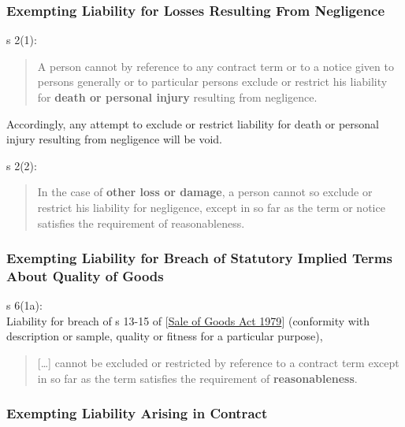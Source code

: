 \documentclass[
]{article}
\begin{document}
\hypertarget{exempting-liability-for-losses-resulting-from-negligence}{%
\subsubsection{Exempting Liability for Losses Resulting From
Negligence}\label{exempting-liability-for-losses-resulting-from-negligence}}

s 2(1):

\begin{quote}
A person cannot by reference to any contract term or to a notice given
to persons generally or to particular persons exclude or restrict his
liability for \textbf{death or personal injury} resulting from
negligence.
\end{quote}

Accordingly, any attempt to exclude or restrict liability for death or
personal injury resulting from negligence will be void.

s 2(2):

\begin{quote}
In the case of \textbf{other loss or damage}, a person cannot so exclude
or restrict his liability for negligence, except in so far as the term
or notice satisfies the requirement of reasonableness.
\end{quote}

\hypertarget{exempting-liability-for-breach-of-statutory-implied-terms-about-quality-of-goods}{%
\subsubsection{Exempting Liability for Breach of Statutory Implied Terms
About Quality of
Goods}\label{exempting-liability-for-breach-of-statutory-implied-terms-about-quality-of-goods}}

s 6(1a):\\
Liability for breach of s 13-15 of
{[}\protect\hyperlink{sale-of-goods-act-1979}{Sale of Goods Act 1979}{]}
(conformity with description or sample, quality or fitness for a
particular purpose),

\begin{quote}
{[}\ldots{]} cannot be excluded or restricted by reference to a contract
term except in so far as the term satisfies the requirement of
\textbf{reasonableness}.
\end{quote}

\hypertarget{exempting-liability-arising-in-contract}{%
\subsubsection{Exempting Liability Arising in
Contract}\label{exempting-liability-arising-in-contract}}
\end{document}
